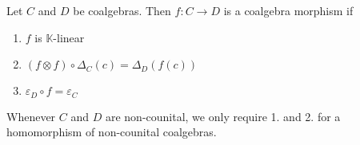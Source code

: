 \documentclass[../thesis.tex]{subfiles}
\begin{document}







                    


            \begin{definition}
                Let $C$ and $D$ be coalgebras. Then $f:C\rightarrow D$ is a coalgebra morphism if
                \begin{enumerate}
                    \item $f$ is $\mathbb{K}$-linear
                    \item $(f\otimes f)\circ\Delta_C(c) = \Delta_D(f(c))$
                    \item $\varepsilon_D \circ f = \varepsilon_C$
                \end{enumerate}
                Whenever $C$ and $D$ are non-counital, we only require 1. and 2. for a homomorphism of non-counital coalgebras.
            \end{definition}
\end{document}
